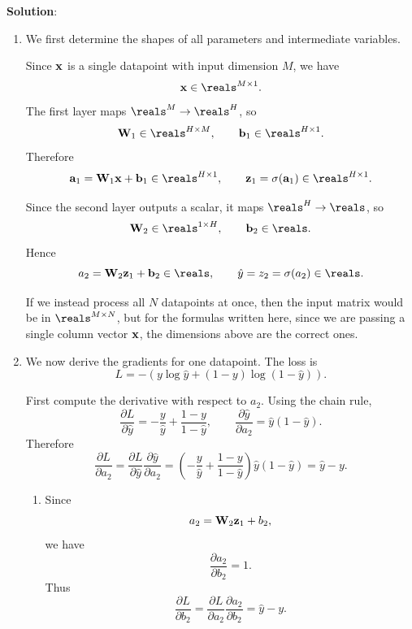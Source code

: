 \documentclass[submit]{harvardml}
\newenvironment{solution}{
    \vspace{2mm}
    \color{blue}\noindent\textbf{Solution}:
}{}
\begin{document}
\begin{solution}
\begin{enumerate}
    \item[1.] We first determine the shapes of all parameters and intermediate variables.

    Since $\bold{x}$ is a single datapoint with input dimension $M$, we have
    \[
    \bold{x} \in \reals^{M \times 1}.
    \]
    The first layer maps $\reals^M \to \reals^H$, so
    \[
    \bold{W}_1 \in \reals^{H \times M},
    \qquad
    \bold{b}_1 \in \reals^{H \times 1}.
    \]
    Therefore
    \[
    \bold{a}_1 = \bold{W}_1 \bold{x} + \bold{b}_1 \in \reals^{H \times 1},
    \qquad
    \bold{z}_1 = \sigma(\bold{a}_1) \in \reals^{H \times 1}.
    \]

    Since the second layer outputs a scalar, it maps $\reals^H \to \reals$, so
    \[
    \bold{W}_2 \in \reals^{1 \times H},
    \qquad
    \bold{b}_2 \in \reals.
    \]
    Hence
    \[
    a_2 = \bold{W}_2 \bold{z}_1 + \bold{b}_2 \in \reals,
    \qquad
    \hat{y} = z_2 = \sigma(a_2) \in \reals.
    \]

    If we instead process all $N$ datapoints at once, then the input matrix would be in $\reals^{M \times N}$, but for the formulas written here, since we are passing a single column vector $\bold{x}$, the dimensions above are the correct ones.

    \item[2.] We now derive the gradients for one datapoint. The loss is
    \[
    L = -\left(y \log \hat{y} + (1-y)\log(1-\hat{y})\right).
    \]

    First compute the derivative with respect to $a_2$. Using the chain rule,
    \[
    \frac{\partial L}{\partial \hat{y}}
    =
    -\frac{y}{\hat{y}} + \frac{1-y}{1-\hat{y}},
    \qquad
    \frac{\partial \hat{y}}{\partial a_2}
    =
    \hat{y}(1-\hat{y}).
    \]
    Therefore
    \[
    \frac{\partial L}{\partial a_2}
    =
    \frac{\partial L}{\partial \hat{y}}
    \frac{\partial \hat{y}}{\partial a_2}
    =
    \left(-\frac{y}{\hat{y}} + \frac{1-y}{1-\hat{y}}\right)\hat{y}(1-\hat{y})
    =
    \hat{y} - y.
    \]

    \begin{enumerate}
        \item Since
        \[
        a_2 = \bold{W}_2 \bold{z}_1 + b_2,
        \]
        we have
        \[
        \frac{\partial a_2}{\partial b_2} = 1.
        \]
        Thus
        \[
        \frac{\partial L}{\partial b_2}
        =
        \frac{\partial L}{\partial a_2}
        \frac{\partial a_2}{\partial b_2}
        =
        \hat{y} - y.
        \]


\end{enumerate}
\end{enumerate}
\end{solution}
\end{document}
